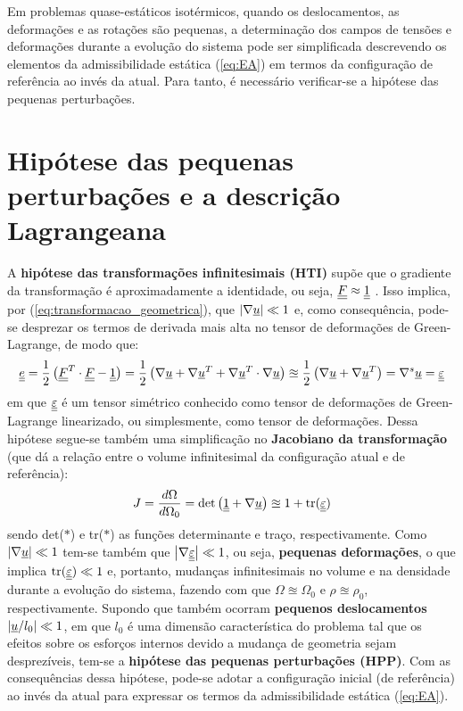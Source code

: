 Em problemas quase-estáticos isotérmicos, quando os deslocamentos, as deformações e as rotações são pequenas, a determinação dos campos de tensões e deformações durante a evolução do sistema pode ser simplificada descrevendo os elementos da admissibilidade estática (\ref{eq:EA}) em termos da configuração de referência ao invés da atual. Para tanto, é necessário verificar-se a hipótese das pequenas perturbações.

\section{Hipótese das pequenas perturbações e a descrição Lagrangeana}

A \textbf{hipótese das transformações infinitesimais (HTI)} supõe que o gradiente da transformação é aproximadamente a identidade, ou seja, $\underline{\underline F} \approx \underline{\underline 1}$ . Isso implica, por (\ref{eq:transformacao_geometrica}), que $\left| \nabla \underline u \right| \ll 1$ e, como consequência, pode-se desprezar os termos de derivada mais alta no tensor de deformações de Green-Lagrange, de modo que:
\begin{equation}
	\label{eq:green_lagrange_linearizado}
	\underline{\underline e} = \frac{1}{2} \left(\underline{\underline F}^T \cdot \underline{\underline F} - \underline{\underline 1} \right) = \frac{1}{2} \left(\nabla \underline u + \nabla\underline u^T + \nabla\underline u^T \cdot \nabla \underline u \right) \approxeq \frac{1}{2} \left(\nabla \underline u + \nabla\underline u^T \right) = \nabla^s\underline u = \underline{\underline \varepsilon}
\end{equation}
em que $\underline{\underline \varepsilon}$ é um tensor simétrico conhecido como tensor de deformações de Green-Lagrange linearizado, ou simplesmente, como tensor de deformações. Dessa hipótese segue-se também uma simplificação no \textbf{Jacobiano da transformação} (que dá a relação entre o volume infinitesimal da configuração atual e de referência):
\begin{equation}
	\label{eq:jacobiano}
	J = \frac{d\Omega}{d\Omega_0} = \text{det}\left(\underline{\underline 1} + \nabla \underline u \right) \approxeq 1 + \text{tr}(\underline{\underline \varepsilon})
\end{equation}
sendo det($*$) e tr($*$) as funções determinante e traço, respectivamente. Como  $\left| \nabla \underline u \right| \ll 1$ tem-se também que $\left| \nabla \underline{\underline \varepsilon} \right| \ll 1$, ou seja, \textbf{pequenas deformações}, o que implica $\text{tr}(\underline{\underline \varepsilon}) \ll 1$ e, portanto, mudanças infinitesimais no volume e na densidade durante a evolução do sistema, fazendo com que $\Omega \approxeq \Omega_0$ e $\rho \approxeq \rho_0$, respectivamente. Supondo que também ocorram \textbf{pequenos deslocamentos} $\left| \underline u / l_0 \right| \ll 1$, em que $l_0$ é uma dimensão característica do problema tal que os efeitos sobre os esforços internos devido a mudança de geometria sejam desprezíveis, tem-se a \textbf{hipótese das pequenas perturbações (HPP)}. Com as consequências dessa hipótese, pode-se adotar a configuração inicial (de referência) ao invés da atual para expressar os termos da admissibilidade estática  (\ref{eq:EA}).

